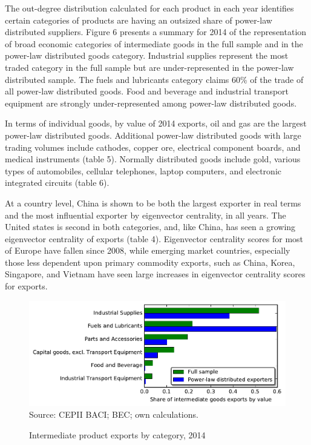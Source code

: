 \documentclass[10pt,letterpaper,pdftex]{article}
\begin{document}
The out-degree distribution calculated for each product in each year identifies certain categories of products are having an outsized share of power-law distributed suppliers. Figure 6 presents a summary for 2014 of the representation of broad economic categories of intermediate goods in the full sample and in the power-law distributed goods category. Industrial supplies represent the most traded category in the full sample but are under-represented in the power-law distributed sample. The fuels and lubricants category claims 60\% of the trade of all power-law distributed goods. Food and beverage and industrial transport equipment are strongly under-represented among power-law distributed goods. 

In terms of individual goods, by value of 2014 exports, oil and gas are the largest power-law distributed goods. Additional power-law distributed goods with large trading volumes include cathodes, copper ore, electrical component boards, and medical instruments (table 5). Normally distributed goods include gold, various types of automobiles, cellular telephones, laptop computers, and electronic integrated circuits (table 6). 

At a country level, China is shown to be both the largest exporter in real terms and the most influential exporter by eigenvector centrality, in all years. The United states is second in both categories, and, like China, has seen a growing eigenvector centrality of exports (table 4). Eigenvector centrality scores for most of Europe have fallen since 2008, while emerging market countries, especially those less dependent upon primary commodity exports, such as China, Korea, Singapore, and Vietnam have seen large increases in eigenvector centrality scores for exports. 

\begin{figure}
  \caption{Intermediate product exports by category, 2014}
  \centering
\includegraphics[scale=0.7]{plots/bec_cat.pdf} \\
\footnotesize{Source: CEPII BACI; BEC; own calculations.}\\
\end{figure}
\end{document}
